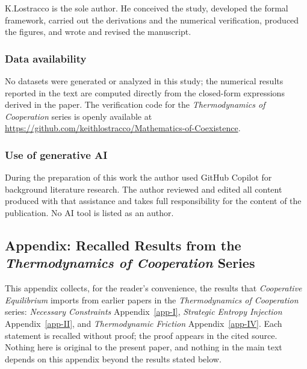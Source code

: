\documentclass[11pt]{article}
\theoremstyle{plain}
\theoremstyle{definition}
\theoremstyle{remark}
\let\origsubsection\subsection
\renewcommand{\subsection}{\needspace{7\baselineskip}\origsubsection}
\let\origsubsubsection\subsubsection
\renewcommand{\subsubsection}{\needspace{4\baselineskip}\origsubsubsection}
\begin{document}
K.Lostracco is the sole author. He conceived the study, developed the
formal framework, carried out the derivations and the numerical
verification, produced the figures, and wrote and revised the
manuscript.

\subsubsection*{Data availability}\label{data-availability}

No datasets were generated or analyzed in this study; the numerical
results reported in the text are computed directly from the closed-form
expressions derived in the paper. The verification code for the
\emph{Thermodynamics of Cooperation} series is openly available at
\url{https://github.com/keithlostracco/Mathematics-of-Coexistence}.

\subsubsection*{Use of generative AI}\label{use-of-generative-ai}

During the preparation of this work the author used GitHub Copilot for
background literature research. The author reviewed and edited all
content produced with that assistance and takes full responsibility for
the content of the publication. No AI tool is listed as an author.

\subsection{\texorpdfstring{Appendix: Recalled Results from the
\emph{Thermodynamics of Cooperation}
Series}{Appendix: Recalled Results from the Thermodynamics of Cooperation Series}}\label{appendix-recalled-results-from-the-thermodynamics-of-cooperation-series}

This appendix collects, for the reader's convenience, the results that
\emph{Cooperative Equilibrium} imports from earlier papers in the
\emph{Thermodynamics of Cooperation} series: \emph{Necessary
Constraints} Appendix~\ref{app-I}, \emph{Strategic Entropy Injection}
Appendix~\ref{app-II}, and \emph{Thermodynamic Friction}
Appendix~\ref{app-IV}. Each statement is recalled without proof; the
proof appears in the cited source. Nothing here is original to the
present paper, and nothing in the main text depends on this appendix
beyond the results stated below.
\end{document}
